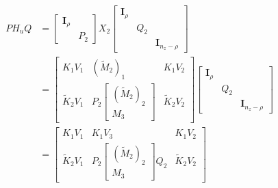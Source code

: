 \documentclass{article}
\begin{document}
\begin{align}
    P H_u Q &= \begin{bmatrix} \bm{I}_\rho & \\ & P_2\end{bmatrix}
    X_2
    \begin{bmatrix}\bm{I}_\rho & & \\ & Q_2 & \\ & & \bm{I}_{n_z-\rho} \end{bmatrix}\\
    &= \begin{bmatrix} K_1 V_1 & (\tilde{M}_2)_1 & K_1 V_2 \\ \tilde{K}_2 V_1 & P_2 \begin{bmatrix} (\tilde{M}_2)_2\\ M_3 \end{bmatrix} & \tilde{K}_2 V_2 \end{bmatrix}
    \begin{bmatrix}\bm{I}_\rho & & \\ & Q_2 & \\ & & \bm{I}_{n_z-\rho} \end{bmatrix}\\
    &= \begin{bmatrix} K_1 V_1 & K_1 V_3 & K_1 V_2 \\ \tilde{K}_2 V_1 & P_2 \begin{bmatrix} (\tilde{M}_2)_2\\ M_3 \end{bmatrix} Q_2 & \tilde{K}_2 V_2 \end{bmatrix}
    \label{eq:left-hand-side-carry}
\end{align}
\end{document}
